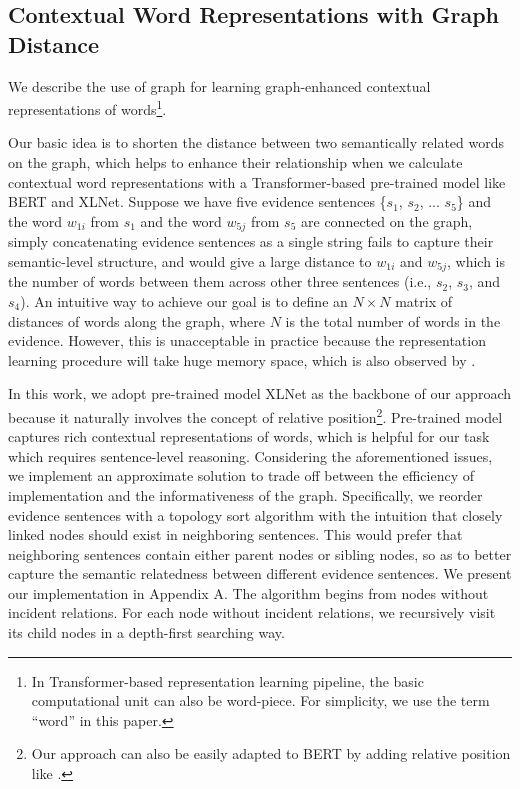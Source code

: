 \documentclass[11pt,a4paper]{article}
\begin{document}
\subsection{Contextual Word Representations with Graph Distance}
\label{sec:graph-based distance}
We describe the use of graph for learning graph-enhanced contextual representations of words\footnote{In Transformer-based representation learning pipeline, the basic computational unit can also be word-piece. For simplicity, we use the term ``word'' in this paper.}. 




Our basic idea is to shorten the distance between two semantically related words on the graph, 
which helps to enhance their relationship 
when we calculate contextual word representations with a Transformer-based \cite{vaswani2017attention} pre-trained model like BERT and XLNet.
Suppose we have five evidence sentences \{$s_1$, $s_2$, ... $s_5$\} and the word $w_{1i}$ from $s_1$ and the word $w_{5j}$ from $s_5$ are connected on the graph,
simply concatenating evidence sentences as a single string fails to capture their semantic-level structure, and would give a large distance to $w_{1i}$ and $w_{5j}$, which is the number of words between them across other three sentences (i.e., $s_2$, $s_3$, and $s_4$).
An intuitive way to achieve our goal is to define an $N \times N$ matrix of distances of words along the graph, where $N$ is the total number of words in the evidence.
However, this is unacceptable in practice because the representation learning procedure will take huge memory space, which is also observed by . 

In this work, we adopt pre-trained model XLNet \cite{yang2019xlnet} as the backbone of our approach because it naturally involves the concept of relative position\footnote{Our approach can also be easily adapted to BERT by adding relative position like .}.
Pre-trained model captures rich contextual representations of words, which is helpful for our task which requires sentence-level reasoning.
Considering the aforementioned issues, we implement an approximate solution to trade off between the efficiency of implementation and the informativeness of the graph.
Specifically,
we reorder evidence sentences with a topology sort algorithm with the intuition that closely linked nodes should exist in neighboring sentences. This would prefer
that neighboring sentences contain either parent nodes or sibling nodes, so as to better capture the semantic relatedness between different evidence sentences.
We present our implementation in Appendix A. The algorithm begins from nodes without incident relations. 
For each node without incident relations, we recursively visit its child nodes in a depth-first searching way.
\end{document}
